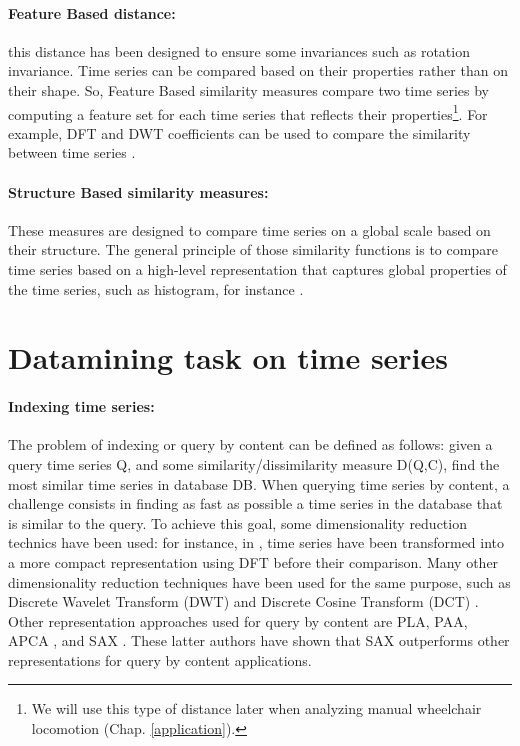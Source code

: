 \paragraph{Feature Based distance:} this distance has been designed to ensure some invariances such as rotation invariance. Time series can be compared based on their properties rather than on their shape. So, Feature Based similarity measures compare two time series by computing a feature set for
each time series that reflects their properties\footnote{We will use this type of distance later when analyzing manual wheelchair locomotion (Chap. \ref{application}).}. For example, DFT and DWT coefficients can be used to compare the similarity between time series \cite{shatkay1996approximate}.


\paragraph{Structure Based similarity measures:}These measures are designed to compare time series on a global scale based on their structure. The general principle of those similarity functions is to compare time series based on a high-level representation that captures global properties of the time series, such as histogram, for instance  \cite{lin2009finding}.   



\section{Datamining task on time series}
\paragraph{Indexing time series: }
The problem of indexing or query by content can be defined as follows: given a query time series Q, and some similarity/dissimilarity measure D(Q,C), find the most similar time series in database DB. When querying time series by content, a challenge consists in finding as fast as possible a time series in the database that is similar to the query. To achieve this goal, some dimensionality reduction technics have been used:  for instance, in \cite{Agrawal1993}, time series have been transformed into a more compact representation using  DFT before their comparison. Many other dimensionality reduction techniques have been used for the same purpose, such as Discrete Wavelet Transform (DWT) and Discrete Cosine Transform (DCT) \cite{chan1999efficient}. Other representation approaches used for query by content are PLA, PAA, APCA \cite{keogh2001locally}, and SAX \cite{Lin2007}. These latter authors \cite{Lin2007}  have shown that SAX outperforms other representations for query by content applications.


